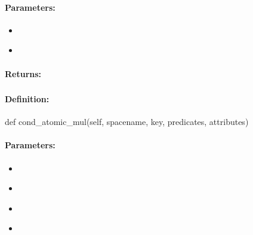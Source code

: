 \paragraph{Parameters:}
\begin{itemize}[noitemsep]
\item {}\\

\item {}\\

\end{itemize}

\paragraph{Returns:}


\pagebreak
\subsubsection{}
\label{api:python:cond_atomic_mul}


\paragraph{Definition:}
\begin{pythoncode}
def cond_atomic_mul(self, spacename, key, predicates, attributes)
\end{pythoncode}

\paragraph{Parameters:}
\begin{itemize}[noitemsep]
\item {}\\

\item {}\\

\item {}\\

\item {}\\

\end{itemize}

